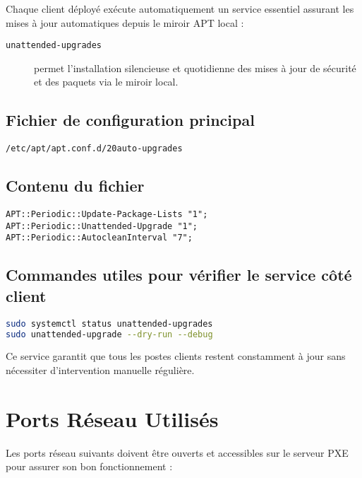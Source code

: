 \documentclass[a4paper,12pt]{article}
\begin{document}
Chaque client déployé exécute automatiquement un service essentiel assurant les mises à jour automatiques depuis le miroir APT local :

\begin{description}
  \item[\texttt{unattended-upgrades}] permet l'installation silencieuse et quotidienne des mises à jour de sécurité et des paquets via le miroir local.
\end{description}

\subsection{Fichier de configuration principal}
\begin{lstlisting}
/etc/apt/apt.conf.d/20auto-upgrades
\end{lstlisting}

\subsection{Contenu du fichier}
\begin{lstlisting}
APT::Periodic::Update-Package-Lists "1";
APT::Periodic::Unattended-Upgrade "1";
APT::Periodic::AutocleanInterval "7";
\end{lstlisting}

\subsection{Commandes utiles pour vérifier le service côté client}
\begin{lstlisting}[language=bash]
sudo systemctl status unattended-upgrades
sudo unattended-upgrade --dry-run --debug
\end{lstlisting}

Ce service garantit que tous les postes clients restent constamment à jour sans nécessiter d’intervention manuelle régulière.

\section{Ports Réseau Utilisés}
Les ports réseau suivants doivent être ouverts et accessibles sur le serveur PXE pour assurer son bon fonctionnement :
\end{document}
